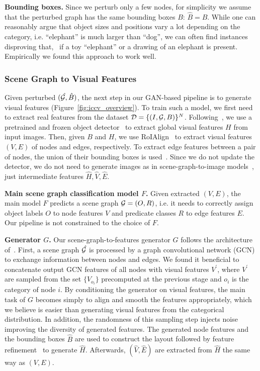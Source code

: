 \textbf{Bounding boxes.} Since we perturb only a few nodes, for simplicity we assume that the perturbed graph has the same bounding boxes $B$: $\hat{B}=B$. While one can reasonably argue that object sizes and positions vary a lot depending on the category, i.e. ``elephant'' is much larger than ``dog'', we can often find instances disproving that, \eg~if a toy ``elephant'' or a drawing of an elephant is present. Empirically we found this approach to work well. 




\subsubsection{Scene Graph to Visual Features\label{sec:generation}}

Given perturbed $(\mathit{\hat{\mathit{\cal G}}}, \hat{B})$, the next step in our GAN-based pipeline is to generate visual features (Figure~\ref{fig:iccv_overview}). 
To train such a model, we first need to extract real features from the dataset ${\cal D}=\{(I,\mathit{\cal G},B)\}^N$.
Following~\citep{xu2017scene,zellers2018neural}, we use a pretrained and frozen object detector~\citep{ren2015faster} to extract global visual features $H$ from input images. 
Then, given $B$ and $H$, we use RoIAlign~\citep{he2017mask} to extract visual features $(V,E)$ of nodes and edges, respectively. To extract edge features between a pair of nodes, the union of their bounding boxes is used~\citep{zellers2018neural}.
Since we do not update the detector, we do not need to generate images as in scene-graph-to-image models~\citep{johnson2018image}, just intermediate features $\hat{H}, \hat{V}, \hat{E}$.


\textbf{Main scene graph classification model $F$.}
Given extracted $(V,E)$, the main model $F$ predicts a scene graph $\mathit{\cal G}=(O,R)$, i.e. it needs to correctly assign object labels $O$ to node features $V$ and predicate classes $R$ to edge features $E$. 
Our pipeline is not constrained to the choice of $F$.

\textbf{Generator $G$.}
Our scene-graph-to-features generator $G$ follows the architecture of~\citep{johnson2018image}. First, a scene graph $\mathit{\hat{\mathit{\cal G}}}$ is processed by a graph convolutional network (GCN) to exchange information between nodes and edges. We found it beneficial to concatenate output GCN features of all nodes with visual features $V^\prime$, where $V^\prime$ are sampled from the set $\{V_{o_i}\}$ precomputed at the previous stage and ${o_i}$ is the category of node $i$. 
By conditioning the generator on visual features, the main task of $G$ becomes simply to align and smooth the features appropriately, which we believe is easier than generating visual features from the categorical distribution.
In addition, the randomness of this sampling step injects noise improving the diversity of generated features. 
The generated node features and the bounding boxes $\hat{B}$ are used to construct the layout followed by feature refinement~\citep{johnson2018image} to generate $\hat{H}$.
Afterwards, $(\hat{V}, \hat{E})$ are extracted from $\hat{H}$ the same way as $(V,E)$.

